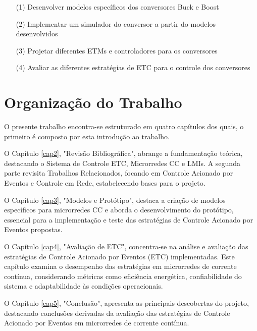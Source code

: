 \begin{enumerate}
  \item[(1)] Desenvolver modelos específicos dos conversores Buck e Boost
  \item[(2)] Implementar um simulador do conversor a partir do modelos desenvolvidos
  \item[(3)] Projetar diferentes ETMs e controladores para os conversores
  \item[(4)] Avaliar as diferentes estratégias de ETC para o controle dos conversores
\end{enumerate}

\section{Organização do Trabalho}

O presente trabalho encontra-se estruturado em quatro capítulos dos quais, o primeiro é composto por esta introdução ao trabalho.

O Capítulo \ref{cap2}, "Revisão Bibliográfica", abrange a fundamentação teórica, destacando o Sistema de Controle ETC, Microrredes CC e LMIs. A segunda parte revisita Trabalhos Relacionados, focando em Controle Acionado por Eventos e Controle em Rede, estabelecendo bases para o projeto.

O Capítulo \ref{cap3}, "Modelos e Protótipo", destaca a criação de modelos específicos para microrredes CC e aborda o desenvolvimento do protótipo, essencial para a implementação e teste das estratégias de Controle Acionado por Eventos propostas.

O Capítulo \ref{cap4}, "Avaliação de ETC", concentra-se na análise e avaliação das estratégias de Controle Acionado por Eventos (ETC) implementadas. Este capítulo examina o desempenho das estratégias em microrredes de corrente contínua, considerando métricas como eficiência energética, confiabilidade do sistema e adaptabilidade às condições operacionais.

O Capítulo \ref{cap5}, "Conclusão", apresenta as principais descobertas do projeto, destacando conclusões derivadas da avaliação das estratégias de Controle Acionado por Eventos em microrredes de corrente contínua.

